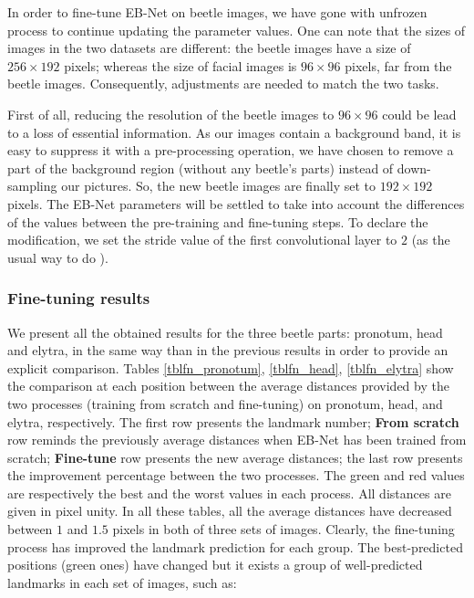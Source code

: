 \documentclass[review]{elsarticle}
\begin{document}
In order to fine-tune EB-Net on beetle images, we have gone with unfrozen process to continue updating the parameter values. One can note that the sizes of images in the two datasets are different: the beetle images have a size of $256 \times 192$ pixels; whereas the size of facial images is $96 \times 96$ pixels, far from the beetle images. Consequently, adjustments are needed to match the two tasks.

First of all, reducing the resolution of the beetle images to $96 \times 96$ could be lead to a loss of essential information. As our images contain a background band, it is easy to suppress it with a pre-processing operation, we have chosen to remove a part of the background region (without any beetle's parts) instead of down-sampling our pictures. So, the new beetle images are finally set to $192 \times 192$ pixels. The EB-Net parameters will be settled to take into account the differences of the values between the pre-training and fine-tuning steps. To declare the modification, we set the stride value of the first convolutional layer to $2$ (as the usual way to do \cite{yosinski2014transferable}). 

\subsubsection{Fine-tuning results}
We present all the obtained results for the three beetle parts: pronotum, head and elytra, in the same way than in the previous results in order to provide an explicit comparison. Tables \ref{tblfn_pronotum}, \ref{tblfn_head}, \ref{tblfn_elytra} show the comparison at each position between the average distances provided by the two processes (training from scratch and fine-tuning) on pronotum, head, and elytra, respectively.  The first row presents the landmark number; \textbf{From scratch} row reminds the previously average distances when EB-Net has been trained from scratch; \textbf{Fine-tune} row presents the new average distances; the last row presents the improvement percentage between the two processes. The green and red values are respectively the best and the worst values in each process. All distances are given in pixel unity. In all these tables, all the average distances have decreased between $1$ and $1.5$ pixels in both of three sets of images. Clearly, the fine-tuning process has improved the landmark prediction for each group. The best-predicted positions (green ones) have changed but it exists a group of well-predicted landmarks in each set of images, such as:
\end{document}
